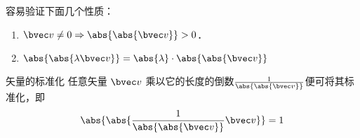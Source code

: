 容易验证下面几个性质：
\begin{enumerate}
\item $\bvec v\neq0\Rightarrow \abs{\abs{\bvec v}}>0$．
\item $\abs{\abs{\lambda\bvec v}}=\abs{\lambda}\cdot\abs{\abs{\bvec v}}$
\end{enumerate}


\begin{example}{矢量的标准化}
任意矢量 $\bvec v$ 乘以它的长度的倒数$\frac{1}{\abs{\abs{\bvec v}}}$便可将其标准化，即
\begin{equation}
\abs{\abs{\frac{1}{\abs{\abs{\bvec v}}}\bvec v}}=1
\end{equation}
\end{example}
